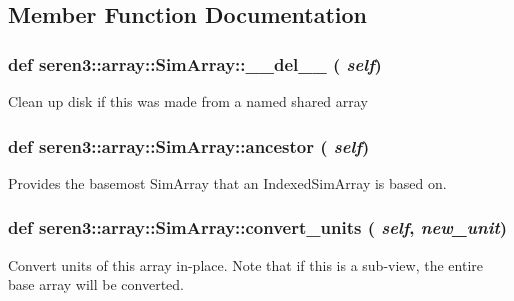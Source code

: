 \subsection{Member Function Documentation}
\hypertarget{classseren3_1_1array_1_1SimArray_af1de1c0b84c2830d9769265bafcf11fe}{
\subsubsection[{\_\-\_\-del\_\-\_\-}]{\setlength{\rightskip}{0pt plus 5cm}def seren3::array::SimArray::\_\-\_\-del\_\-\_\- ( {\em self})}}
\label{classseren3_1_1array_1_1SimArray_af1de1c0b84c2830d9769265bafcf11fe}
\begin{DoxyVerb}Clean up disk if this was made from a named
shared array\end{DoxyVerb}
 \hypertarget{classseren3_1_1array_1_1SimArray_ada3734a91a99489e80b54506a7260895}{
\subsubsection[{ancestor}]{\setlength{\rightskip}{0pt plus 5cm}def seren3::array::SimArray::ancestor ( {\em self})}}
\label{classseren3_1_1array_1_1SimArray_ada3734a91a99489e80b54506a7260895}
\begin{DoxyVerb}Provides the basemost SimArray that an IndexedSimArray is based on.\end{DoxyVerb}
 \hypertarget{classseren3_1_1array_1_1SimArray_a3e99c2da5822f2834912bc20d7f9d3d8}{
\subsubsection[{convert\_\-units}]{\setlength{\rightskip}{0pt plus 5cm}def seren3::array::SimArray::convert\_\-units ( {\em self}, \/   {\em new\_\-unit})}}
\label{classseren3_1_1array_1_1SimArray_a3e99c2da5822f2834912bc20d7f9d3d8}
\begin{DoxyVerb}Convert units of this array in-place. Note that if
this is a sub-view, the entire base array will be converted.\end{DoxyVerb}
